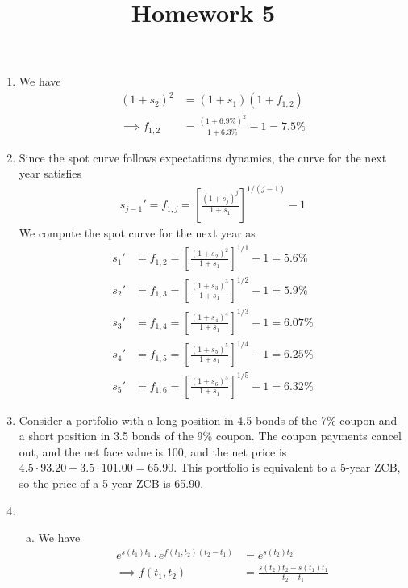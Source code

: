 \documentclass{article}
\begin{document}
\title{Homework 5}
\maketitle
\thispagestyle{fancy}

\begin{enumerate}[1.]
	\item 
		\begin{soln}
			We have 
			\begin{align*}
				(1+s_2)^2 &= (1+s_1)(1+f_{1, 2}) \\
				\implies f_{1, 2} &= \frac{(1+6.9\%)^2}{1+6.3\%}-1 = \boxed{7.5\%}
			\end{align*}
		\end{soln}

	\item
		\begin{soln}
			Since the spot curve follows expectations dynamics, the curve for the next year satisfies
			\begin{align*}
				s_{j-1}' = f_{1, j} = \left[ \frac{(1+s_j)^j}{1+s_1} \right]^{1/(j-1)} - 1
			\end{align*}
			We compute the spot curve for the next year as
			\begin{align*}
				s_1' &= f_{1, 2} = \left[ \frac{(1+s_2)^2}{1+s_1} \right]^{1/1} - 1 = 5.6\% \\
				s_2' &= f_{1, 3} = \left[ \frac{(1+s_3)^3}{1+s_1} \right]^{1/2} - 1 = 5.9\% \\
				s_3' &= f_{1, 4} = \left[ \frac{(1+s_4)^4}{1+s_1} \right]^{1/3}-1 = 6.07\% \\
				s_4' &= f_{1, 5} = \left[ \frac{(1+s_5)^5}{1+s_1} \right]^{1/4} - 1 =6.25\% \\
				s_5' &= f_{1, 6} = \left[ \frac{(1+s_6)^5}{1+s_1} \right]^{1/5} - 1 = 6.32\%
			\end{align*}
		\end{soln}

	\item 
		\begin{soln}
			Consider a portfolio with a long position in 4.5 bonds of the 7\% coupon and a short position in 3.5 bonds of the 9\% coupon. The coupon payments cancel out, and the net face value is 100, and the net price is $4.5\cdot 93.20-3.5\cdot 101.00 = 65.90.$ This portfolio is equivalent to a 5-year ZCB, so the price of a 5-year ZCB is 65.90.
		\end{soln}

	\item  
		\begin{enumerate}[(a)]
			\item
				\begin{soln}
					We have
					\begin{align*}
						e^{s(t_1)t_1}\cdot e^{f(t_1, t_2)(t_2-t_1)} &= e^{s(t_2)t_2} \\
						\implies f(t_1, t_2) &= \boxed{\frac{s(t_2)t_2-s(t_1)t_1}{t_2-t_1}}
					\end{align*}
				\end{soln}


\end{enumerate}
\end{enumerate}
\end{document}
